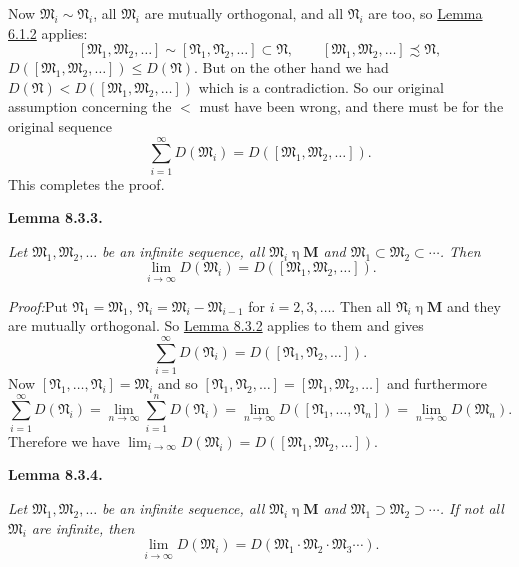 \documentclass[12pt,b5paper,twoside]{article}
\newcommand{\M}{\mathbf M}
\newcommand{\Lemma}[1]{%
  \par\smallskip\noindent\phantomsection\label{lem:#1}\textbf{Lemma #1.}\enspace
}
\newcommand{\Proof}{\par\noindent\textit{Proof:}\enspace}
\newcommand{\lemref}[1]{\hyperref[lem:#1]{Lemma #1}}
\begin{document}
Now $\mathfrak M_i\sim\mathfrak N_i$, all $\mathfrak M_i$ are mutually
orthogonal, and all $\mathfrak N_i$ are too, so \lemref{6.1.2} applies:
\[
 [\mathfrak M_1,\mathfrak M_2,\ldots]
 \sim[\mathfrak N_1,\mathfrak N_2,\ldots]\subset\mathfrak N,
 \qquad
 [\mathfrak M_1,\mathfrak M_2,\ldots]\precsim\mathfrak N,
\]
$D([\mathfrak M_1,\mathfrak M_2,\ldots])\leq D(\mathfrak N)$. But on the
other hand we had
$D(\mathfrak N)<D([\mathfrak M_1,\mathfrak M_2,\ldots])$ which is a
contradiction. So our original assumption concerning the $<$ must have been
wrong, and there must be for the original sequence
\[
 \sum_{i=1}^\infty D(\mathfrak M_i)
 =D([\mathfrak M_1,\mathfrak M_2,\ldots]).
\]
This completes the proof.

\Lemma{8.3.3}
{\itshape
Let $\mathfrak M_1,\mathfrak M_2,\ldots$ be an infinite sequence, all
$\mathfrak M_i\mathbin\eta\M$ and
$\mathfrak M_1\subset\mathfrak M_2\subset\cdots$. Then
\[
 \lim_{i\to\infty}D(\mathfrak M_i)
 =D([\mathfrak M_1,\mathfrak M_2,\ldots]).
\]}

\Proof Put $\mathfrak N_1=\mathfrak M_1$,
$\mathfrak N_i=\mathfrak M_i-\mathfrak M_{i-1}$ for $i=2,3,\ldots$. Then all
$\mathfrak N_i\mathbin\eta\M$ and they are mutually orthogonal. So
\lemref{8.3.2} applies to them and gives
\[
 \sum_{i=1}^\infty D(\mathfrak N_i)
 =D([\mathfrak N_1,\mathfrak N_2,\ldots]).
\]
Now $[\mathfrak N_1,\ldots,\mathfrak N_i]=\mathfrak M_i$ and so
$[\mathfrak N_1,\mathfrak N_2,\ldots]=
[\mathfrak M_1,\mathfrak M_2,\ldots]$ and furthermore
\[
 \sum_{i=1}^\infty D(\mathfrak N_i)
 =\lim_{n\to\infty}\sum_{i=1}^nD(\mathfrak N_i)
 =\lim_{n\to\infty}D([\mathfrak N_1,\ldots,\mathfrak N_n])
 =\lim_{n\to\infty}D(\mathfrak M_n).
\]
Therefore we have
$\lim_{i\to\infty}D(\mathfrak M_i)=
D([\mathfrak M_1,\mathfrak M_2,\ldots])$.

\Lemma{8.3.4}
{\itshape
Let $\mathfrak M_1,\mathfrak M_2,\ldots$ be an infinite sequence, all
$\mathfrak M_i\mathbin\eta\M$ and
$\mathfrak M_1\supset\mathfrak M_2\supset\cdots$. If not all $\mathfrak M_i$
are infinite, then
\[
 \lim_{i\to\infty}D(\mathfrak M_i)
 =D(\mathfrak M_1\cdot\mathfrak M_2\cdot\mathfrak M_3\cdots).
\]}
\end{document}
